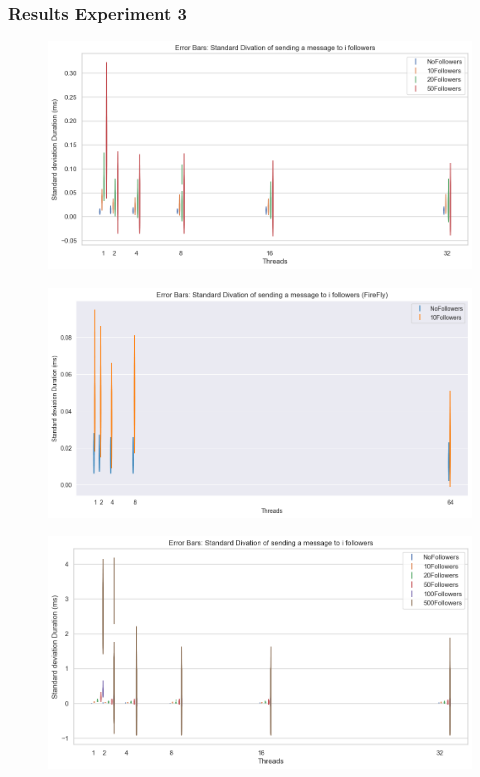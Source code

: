 \documentclass[a4paper]{article}
\begin{document}
\subsubsection{Results Experiment 3}
\begin{figure}[H]
	\centering
	\includegraphics[width = \linewidth]{Images/ErrorBarsLatency.png}
	\caption{}
\end{figure}
\begin{figure}[H]
	\centering
	\includegraphics[width = \linewidth]{Images/ErrorBarsLatencyFireFly.png}
	\caption{}
\end{figure}
\begin{figure}[H]
	\centering
	\includegraphics[width = \linewidth]{Images/ErrorBarsLatencyFull.png}
	\caption{}
\end{figure}
\end{document}

